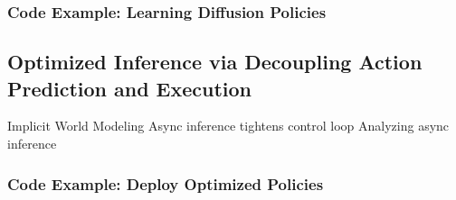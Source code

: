 \subsubsection{Code Example: Learning Diffusion Policies}

\subsection{Optimized Inference via Decoupling Action Prediction and Execution}
Implicit World Modeling 
Async inference tightens control loop
Analyzing async inference

\subsubsection{Code Example: Deploy Optimized Policies}
